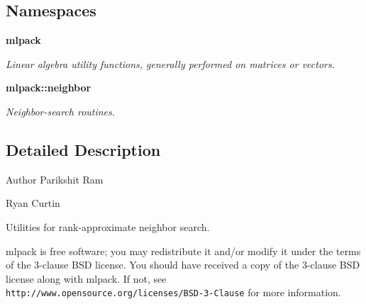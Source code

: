 \subsection*{Namespaces}
\begin{DoxyCompactItemize}
\item 
 {\bf mlpack}
\begin{DoxyCompactList}\small\item\em Linear algebra utility functions, generally performed on matrices or vectors. \end{DoxyCompactList}\item 
 {\bf mlpack\+::neighbor}
\begin{DoxyCompactList}\small\item\em Neighbor-\/search routines. \end{DoxyCompactList}\end{DoxyCompactItemize}


\subsection{Detailed Description}
\begin{DoxyAuthor}{Author}
Parikshit Ram 

Ryan Curtin
\end{DoxyAuthor}
Utilities for rank-\/approximate neighbor search.

mlpack is free software; you may redistribute it and/or modify it under the terms of the 3-\/clause B\+SD license. You should have received a copy of the 3-\/clause B\+SD license along with mlpack. If not, see {\tt http\+://www.\+opensource.\+org/licenses/\+B\+S\+D-\/3-\/\+Clause} for more information. 
